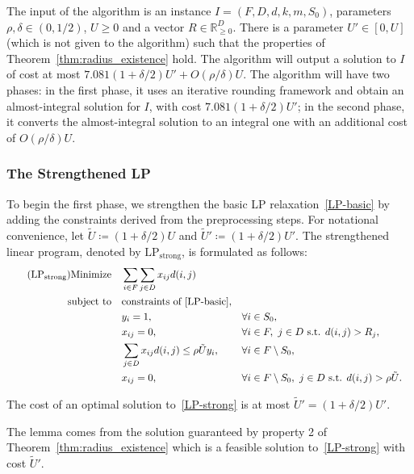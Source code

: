 The input of the algorithm is an instance $I = (F,D,d,k,m,S_0)$, parameters $\rho,\delta \in (0,1/2)$, $U \geq 0$ and a vector $R \in \mathbb{R}_{\geq 0}^{D}$. There is a parameter $U' \in [0,U]$ (which is not given to the algorithm) such that the properties of Theorem~\ref{thm:radius_existence} hold. 
The algorithm will output a solution to $I$ of cost at most $7.081(1 + \delta/2)U' + O(\rho/\delta)U$. The algorithm will have two phases: in the first phase, it uses an iterative rounding framework and obtain an almost-integral solution for $I$, with cost $7.081(1 + \delta/2)U'$; in the second phase, it converts the almost-integral solution to an integral one with an additional cost of $O(\rho/\delta)U$.

\subsubsection{The Strengthened LP}

To begin the first phase, we strengthen the basic LP relaxation~\eqref{LP-basic} by adding the constraints derived from the preprocessing steps. For notational convenience, let $\tilde{U} \coloneqq (1 + \delta/2)U$ and $\tilde{U}' \coloneqq (1 + \delta/2)U'$. The strengthened linear program, denoted by $\text{LP}_{\text{strong}}$, is formulated as follows:
\begin{align} \tag{$\text{LP}_{\text{strong}}$} \label{LP-strong}
\text{Minimize} \quad &\sum_{i \in F} \sum_{j \in D} x_{ij} d(i,j) \\
\text{subject to} \quad &\text{constraints of } \eqref{LP-basic}, \nonumber \\
& y_i = 1, \quad &&\forall i \in S_0, \nonumber \\
& x_{ij} = 0, \quad &&\forall i \in F, \ j \in D \text{ s.t. } d(i,j) > R_j, \nonumber \\
& \sum_{j \in D} x_{ij} d(i,j) \leq \rho \tilde{U} y_i, \quad &&\forall i \in F \setminus S_0, \nonumber \\
& x_{ij} = 0, \quad &&\forall i \in F \setminus S_0, \ j \in D \text{ s.t. } d(i,j) > \rho \tilde{U}. \nonumber
\end{align}

\begin{lemma} \label{lem:strong_lp_cost}
The cost of an optimal solution to~\eqref{LP-strong} is at most $\tilde{U}' = (1 + \delta/2)U'$.
\end{lemma}

The lemma comes from the solution guaranteed by property 2 of Theorem~\ref{thm:radius_existence} which is a feasible solution to~\ref{LP-strong} with cost $\tilde{U}'$.

